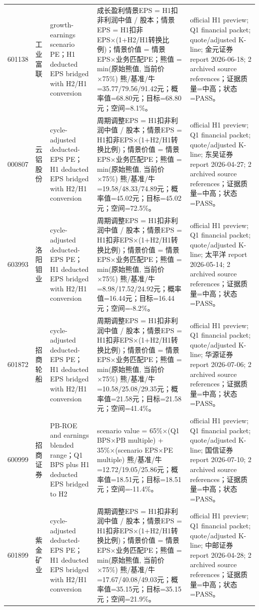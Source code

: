 \begin{longtable}{L{0.85cm}L{1.55cm}L{2.25cm}L{6.0cm}L{4.0cm}}
601138 & 工业富联 & growth-earnings scenario PE；H1 deducted EPS bridged with H2/H1 conversion & 成长盈利情景EPS = H1扣非利润中值 / 股本；情景EPS = H1扣非EPS×(1+H2/H1转换比例)；情景价值 = 情景EPS×业务匹配PE；熊值 = min(原始熊值, 当前价×75\%) 熊/基准/牛=35.77/79.56/91.42元；概率值=68.80元；目标=68.80元；空间=8.1\%。 & official H1 preview; Q1 financial packet; quote/adjusted K-line; 金元证券 report 2026-06-18; 2 archived source references；证据质量=中高；状态=PASS。 \\
000807 & 云铝股份 & cycle-adjusted deducted-EPS PE；H1 deducted EPS bridged with H2/H1 conversion & 周期调整EPS = H1扣非利润中值 / 股本；情景EPS = H1扣非EPS×(1+H2/H1转换比例)；情景价值 = 情景EPS×业务匹配PE；熊值 = min(原始熊值, 当前价×75\%) 熊/基准/牛=19.58/48.33/74.89元；概率值=45.02元；目标=45.02元；空间=72.5\%。 & official H1 preview; Q1 financial packet; quote/adjusted K-line; 东吴证券 report 2026-04-27; 2 archived source references；证据质量=中高；状态=PASS。 \\
603993 & 洛阳钼业 & cycle-adjusted deducted-EPS PE；H1 deducted EPS bridged with H2/H1 conversion & 周期调整EPS = H1扣非利润中值 / 股本；情景EPS = H1扣非EPS×(1+H2/H1转换比例)；情景价值 = 情景EPS×业务匹配PE；熊值 = min(原始熊值, 当前价×75\%) 熊/基准/牛=8.98/17.52/24.92元；概率值=16.44元；目标=16.44元；空间=-8.2\%。 & official H1 preview; Q1 financial packet; quote/adjusted K-line; 太平洋 report 2026-05-14; 2 archived source references；证据质量=中高；状态=PASS。 \\
601872 & 招商轮船 & cycle-adjusted deducted-EPS PE；H1 deducted EPS bridged with H2/H1 conversion & 周期调整EPS = H1扣非利润中值 / 股本；情景EPS = H1扣非EPS×(1+H2/H1转换比例)；情景价值 = 情景EPS×业务匹配PE；熊值 = min(原始熊值, 当前价×75\%) 熊/基准/牛=10.58/25.08/29.35元；概率值=21.58元；目标=21.58元；空间=41.4\%。 & official H1 preview; Q1 financial packet; quote/adjusted K-line; 华源证券 report 2026-07-06; 2 archived source references；证据质量=中高；状态=PASS。 \\
600999 & 招商证券 & PB-ROE and earnings blended range；Q1 BPS plus H1 deducted EPS bridged to H2 & scenario value = 65\%×(Q1 BPS×PB multiple) + 35\%×(scenario EPS×PE multiple) 熊/基准/牛=12.72/19.05/25.86元；概率值=18.51元；目标=18.51元；空间=-11.4\%。 & official H1 preview; Q1 financial packet; quote/adjusted K-line; 国信证券 report 2026-07-10; 2 archived source references；证据质量=中高；状态=PASS。 \\
601899 & 紫金矿业 & cycle-adjusted deducted-EPS PE；H1 deducted EPS bridged with H2/H1 conversion & 周期调整EPS = H1扣非利润中值 / 股本；情景EPS = H1扣非EPS×(1+H2/H1转换比例)；情景价值 = 情景EPS×业务匹配PE；熊值 = min(原始熊值, 当前价×75\%) 熊/基准/牛=17.67/40.08/49.03元；概率值=35.15元；目标=35.15元；空间=21.9\%。 & official H1 preview; Q1 financial packet; quote/adjusted K-line; 中邮证券 report 2026-04-28; 2 archived source references；证据质量=中高；状态=PASS。 \\

\end{longtable}
